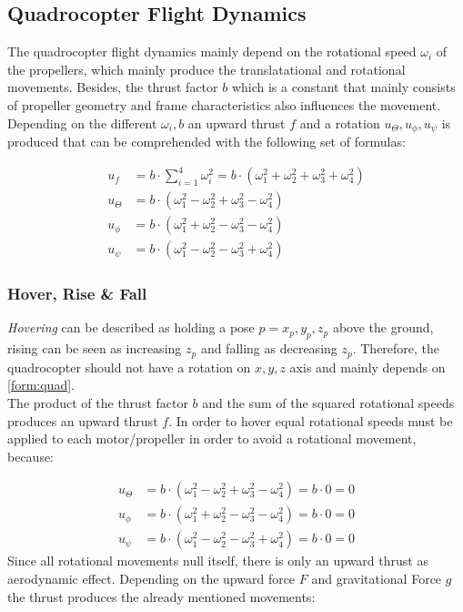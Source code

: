 \newpage 


\subsection{Quadrocopter Flight Dynamics}
The quadrocopter flight dynamics mainly depend on the rotational speed $\omega_i$ of the propellers, which mainly produce the translatational  and rotational movements. Besides, the thrust factor $b$ which is a constant that mainly consists of propeller geometry and frame characteristics also influences the movement. Depending on the different $\omega_i, b$ an upward thrust $f$ and a rotation $u_{\Theta}, u_{\phi}, u_{\psi}$ is produced that can be comprehended with the following set of formulas:

\begin{align}
	u_f &= b \cdot \sum_{i=1}^{4}\omega_i^2 = b \cdot ( \omega_1^2 + \omega_2^2 + \omega_3^2 + \omega_4^2)\label{form:quad}\\
	u_{\Theta} &= b \cdot (\omega_1^2 - \omega_2^2 + \omega_3^2 - \omega_4^2) \label{form:quad2}\\
	u_{\phi} &= b \cdot (\omega_1^2 + \omega_2^2 - \omega_3^2 - \omega_4^2)\label{form:quad3}\\
	u_{\psi} &= b \cdot (\omega_1^2 - \omega_2^2 - \omega_3^2 + \omega_4^2)\label{form:quad4}
\end{align}

\subsubsection{Hover, Rise \& Fall} \label{sec:hover}
\emph{Hovering} can be described as holding a pose $p = {x_p, y_p, z_p}$ above the ground, rising can be seen as increasing $z_p$ and falling as decreasing $z_p$. Therefore, the quadrocopter should not have a rotation on $x,y,z$ axis and mainly depends on \cref{form:quad}.  \\
The product of the thrust factor $b$ and the sum of the squared rotational speeds produces an upward thrust $f$. In order to hover equal rotational speeds must be applied to each motor/propeller in order to avoid a rotational movement, because:

\begin{align}
	u_{\Theta} &= b \cdot (\omega_1^2 - \omega_2^2 + \omega_3^2 - \omega_4^2) = b \cdot 0 = 0\\
	u_{\phi} &= b \cdot (\omega_1^2 + \omega_2^2 - \omega_3^2 - \omega_4^2) = b \cdot 0 = 0\\
	u_{\psi} &= b \cdot (\omega_1^2 - \omega_2^2 - \omega_3^2 + \omega_4^2)	= b \cdot 0 = 0
\end{align}
Since all rotational movements null itself, there is only an upward thrust as aerodynamic effect.
Depending on the upward force $F$ and gravitational Force $g$ the thrust produces the already mentioned movements:

